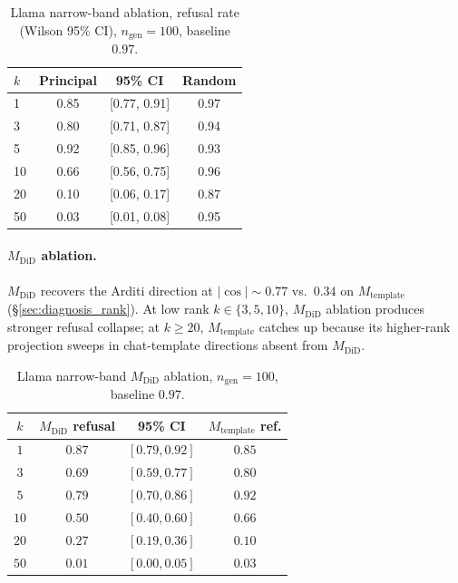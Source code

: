 \documentclass[10pt]{article}
\theoremstyle{definition}
\theoremstyle{remark}
\begin{document}
\begin{table}[h]\centering
\caption{Llama narrow-band ablation, refusal rate
(Wilson 95\% CI), $n_{\mathrm{gen}}=100$, baseline $0.97$.}
\label{tab:ablation_llama}
\begin{tabular}{@{}lccc@{}}
\toprule
$k$ & Principal & 95\% CI & Random \\
\midrule
1  & 0.85 & [0.77, 0.91] & 0.97 \\
3  & 0.80 & [0.71, 0.87] & 0.94 \\
5  & 0.92 & [0.85, 0.96] & 0.93 \\
10 & 0.66 & [0.56, 0.75] & 0.96 \\
20 & 0.10 & [0.06, 0.17] & 0.87 \\
50 & 0.03 & [0.01, 0.08] & 0.95 \\
\bottomrule
\end{tabular}
\end{table}

\paragraph{$M_{\mathrm{DiD}}$ ablation.}
$M_{\mathrm{DiD}}$ recovers the Arditi direction at
$|\cos|\sim 0.77$ vs.\ $0.34$ on $M_{\mathrm{template}}$
(\S\ref{sec:diagnosis_rank}).  At low rank
$k\in\{3,5,10\}$, $M_{\mathrm{DiD}}$ ablation produces
stronger refusal collapse; at $k\geq 20$,
$M_{\mathrm{template}}$ catches up because its
higher-rank projection sweeps in chat-template directions
absent from $M_{\mathrm{DiD}}$.

\begin{table}[h]\centering
\caption{Llama narrow-band $M_{\mathrm{DiD}}$ ablation,
$n_{\mathrm{gen}} = 100$, baseline $0.97$.}
\label{tab:ablation_llama_mdid}
\begin{tabular}{@{}cccc@{}}
\toprule
$k$ & $M_{\mathrm{DiD}}$ refusal & 95\% CI &
$M_{\mathrm{template}}$ ref. \\
\midrule
$1$  & $0.87$ & $[0.79, 0.92]$ & $0.85$ \\
$3$  & $\mathbf{0.69}$ & $[0.59, 0.77]$ & $0.80$ \\
$5$  & $\mathbf{0.79}$ & $[0.70, 0.86]$ & $0.92$ \\
$10$ & $\mathbf{0.50}$ & $[0.40, 0.60]$ & $0.66$ \\
$20$ & $0.27$ & $[0.19, 0.36]$ & $0.10$ \\
$50$ & $0.01$ & $[0.00, 0.05]$ & $0.03$ \\
\bottomrule
\end{tabular}
\end{table}
\end{document}
